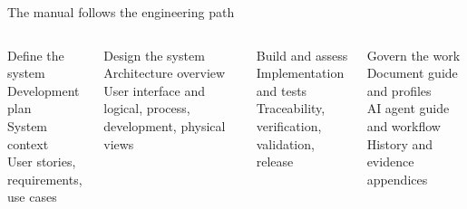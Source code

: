 \begin{frame}{The manual follows the engineering path}
\small
\begin{columns}[T,onlytextwidth]
\begin{block}{Define the system}
Development plan\\System context\\User stories, requirements, use cases
\end{block}
\begin{block}{Design the system}
Architecture overview\\User interface and logical, process, development, physical views
\end{block}
\begin{block}{Build and assess}
Implementation and tests\\Traceability, verification, validation, release
\end{block}
\begin{block}{Govern the work}
Document guide and profiles\\AI agent guide and workflow\\History and evidence appendices
\end{block}
\end{columns}
\end{frame}
